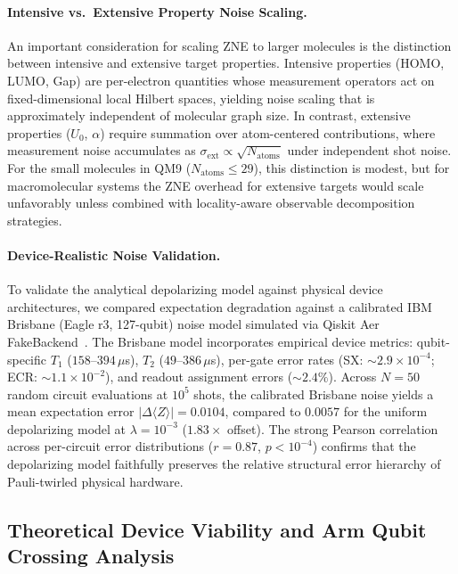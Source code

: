 \documentclass[10pt,twocolumn,letterpaper]{article}
\begin{document}
\paragraph{Intensive vs.\ Extensive Property Noise Scaling.}
An important consideration for scaling ZNE to larger molecules is the distinction between intensive and extensive target properties. Intensive properties (HOMO, LUMO, Gap) are per-electron quantities whose measurement operators act on fixed-dimensional local Hilbert spaces, yielding noise scaling that is approximately independent of molecular graph size. In contrast, extensive properties ($U_0$, $\alpha$) require summation over atom-centered contributions, where measurement noise accumulates as $\sigma_{\mathrm{ext}} \propto \sqrt{N_{\mathrm{atoms}}}$ under independent shot noise. For the small molecules in QM9 ($N_{\mathrm{atoms}} \le 29$), this distinction is modest, but for macromolecular systems the ZNE overhead for extensive targets would scale unfavorably unless combined with locality-aware observable decomposition strategies.

\paragraph{Device-Realistic Noise Validation.}
To validate the analytical depolarizing model against physical device architectures, we compared expectation degradation against a calibrated IBM Brisbane (Eagle r3, 127-qubit) noise model simulated via Qiskit Aer FakeBackend~\cite{Kim:2023bwr}. The Brisbane model incorporates empirical device metrics: qubit-specific $T_1$ ($158$--$394\,\mu$s), $T_2$ ($49$--$386\,\mu$s), per-gate error rates (SX: $\sim 2.9 \times 10^{-4}$; ECR: $\sim 1.1 \times 10^{-2}$), and readout assignment errors ($\sim 2.4\%$). Across $N = 50$ random circuit evaluations at $10^5$ shots, the calibrated Brisbane noise yields a mean expectation error $|\Delta\langle Z \rangle| = 0.0104$, compared to $0.0057$ for the uniform depolarizing model at $\lambda = 10^{-3}$ ($1.83\times$ offset). The strong Pearson correlation across per-circuit error distributions ($r = 0.87$, $p < 10^{-4}$) confirms that the depolarizing model faithfully preserves the relative structural error hierarchy of Pauli-twirled physical hardware.

\subsection{Theoretical Device Viability and Arm Qubit Crossing Analysis}
\end{document}
